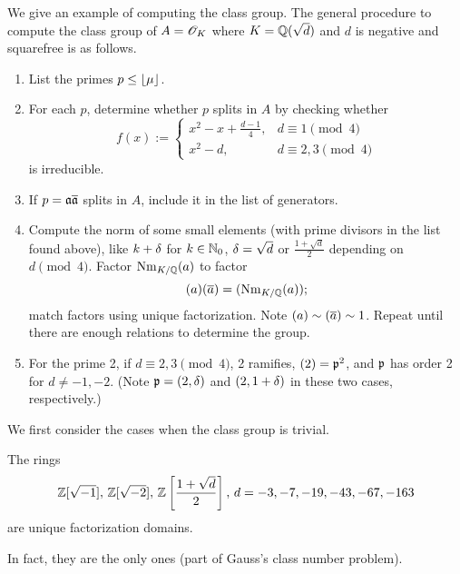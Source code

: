 We give an example of computing the class group. The general procedure to compute the class group of $A=\mathscr{O}_{K}$ where $K=\mathbb{Q}(\sqrt d)$ and $d$ is negative and squarefree is as follows.
\begin{enumerate}
\item
List the primes $p\le \left\lfloor {\mu}\right\rfloor$.
\item
For each $p$, determine whether $p$ splits in $A$ by checking whether 
\[
f(x):=
\begin{cases}
x^2-x+\frac{d-1}{4},&d\equiv 1\pmod 4\\
x^2-d,&d\equiv 2,3\pmod 4
\end{cases}
\]
is irreducible.
\item If $p=\mathfrak{a}\overline{\mathfrak{a}}$ splits in $A$, include it in the list of generators.
\item Compute the norm of some small elements (with prime divisors in the list found above), like $k+\delta$ for $k\in \mathbb{N}_0$, $\delta=\sqrt{d}$ or $\frac{1+\sqrt{d}}2$ depending on $d\pmod 4$. Factor $\operatorname{Nm}_{K/\mathbb{Q}}(a)$ to factor
\[
(a)(\overline{a})=(\operatorname{Nm}_{K/\mathbb{Q}}(a));
\]
match factors using unique factorization. Note $(a)\sim (\overline{a})\sim 1$. %
Repeat until there are enough relations to determine the group.
\item For the prime 2, 
 if $d\equiv 2,3\pmod 4$, 2 ramifies, $(2)=\mathfrak{p}^2$, and $\mathfrak{p}$ has order 2 for $d\ne -1,-2$. (Note $\mathfrak{p}=(2,\delta)$ and $(2,1+\delta)$ in these two cases, respectively.)
\end{enumerate}
We first consider the cases when the class group is trivial.
\begin{thm}
The rings
\[
\mathbb{Z}[\sqrt{-1}],\,\mathbb{Z}[\sqrt{-2}],\,\mathbb{Z}\left[ {\frac{1+\sqrt{d}}{2}} \right],\,d=-3,-7,-19,-43,-67,-163
\]
are unique factorization domains.
\end{thm}
In fact, they are the only ones (part of Gauss's class number problem).
